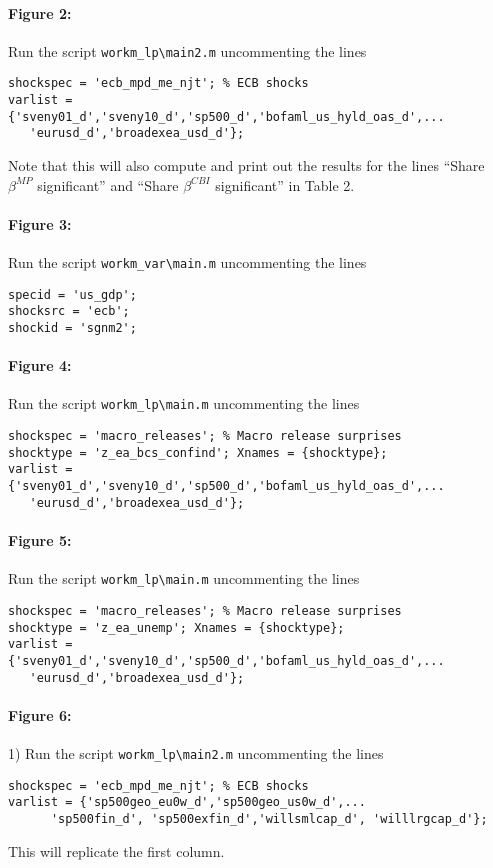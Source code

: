 \documentclass[12pt]{article}
\begin{document}
\paragraph{Figure 2:} Run the script
\verb|workm_lp\main2.m| uncommenting the lines
\begin{verbatim}
shockspec = 'ecb_mpd_me_njt'; % ECB shocks
varlist = {'sveny01_d','sveny10_d','sp500_d','bofaml_us_hyld_oas_d',...
   'eurusd_d','broadexea_usd_d'};
\end{verbatim}
Note that this will also compute and print out the results for the lines ``Share $\beta^{MP}$ significant'' and 
``Share $\beta^{CBI}$ significant'' in Table 2. 

\paragraph{Figure 3:} Run the script
\verb|workm_var\main.m| uncommenting the lines
\begin{verbatim}
specid = 'us_gdp';
shocksrc = 'ecb';
shockid = 'sgnm2';
\end{verbatim}

\paragraph{Figure 4:} Run the script
\verb|workm_lp\main.m| uncommenting the lines
\begin{verbatim}
shockspec = 'macro_releases'; % Macro release surprises
shocktype = 'z_ea_bcs_confind'; Xnames = {shocktype};
varlist = {'sveny01_d','sveny10_d','sp500_d','bofaml_us_hyld_oas_d',...
   'eurusd_d','broadexea_usd_d'};
\end{verbatim}

\paragraph{Figure 5:} Run the script
\verb|workm_lp\main.m| uncommenting the lines
\begin{verbatim}
shockspec = 'macro_releases'; % Macro release surprises
shocktype = 'z_ea_unemp'; Xnames = {shocktype};
varlist = {'sveny01_d','sveny10_d','sp500_d','bofaml_us_hyld_oas_d',...
   'eurusd_d','broadexea_usd_d'};
\end{verbatim}

\paragraph{Figure 6:} 
1) Run the script
\verb|workm_lp\main2.m| uncommenting the lines
\begin{verbatim}
shockspec = 'ecb_mpd_me_njt'; % ECB shocks
varlist = {'sp500geo_eu0w_d','sp500geo_us0w_d',...
      'sp500fin_d', 'sp500exfin_d','willsmlcap_d', 'willlrgcap_d'};
\end{verbatim}
This will replicate the first column.
\end{document}
